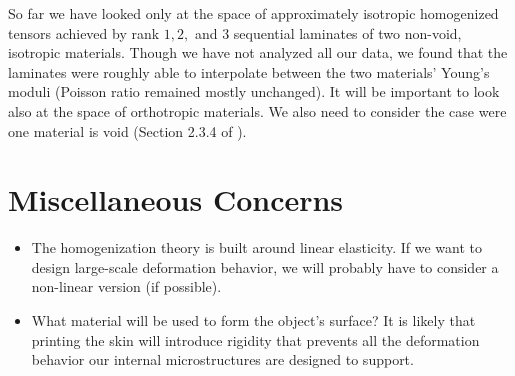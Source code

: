 \documentclass[10pt]{article}
\begin{document}
So far we have looked only at the space of approximately isotropic homogenized
tensors achieved by rank $1, 2, $ and $3$ sequential laminates of two
non-void, isotropic materials. Though we have not analyzed all our data, we
found that the laminates were roughly able to interpolate between the two
materials' Young's moduli (Poisson ratio remained mostly unchanged). It will be
important to look also at the space of orthotropic materials. We also need to
consider the case were one material is void (Section 2.3.4 of
\cite{allaire2002shape}).


\section{Miscellaneous Concerns}
\begin{itemize}
    \item The homogenization theory is built around linear elasticity. If we want to
        design large-scale deformation behavior, we will probably have to
        consider a non-linear version (if possible).

    \item What material will be used to form the object's surface? It is likely
        that printing the skin will introduce rigidity that prevents all the
        deformation behavior our internal microstructures are designed to
        support.
\end{itemize}






\end{document}
